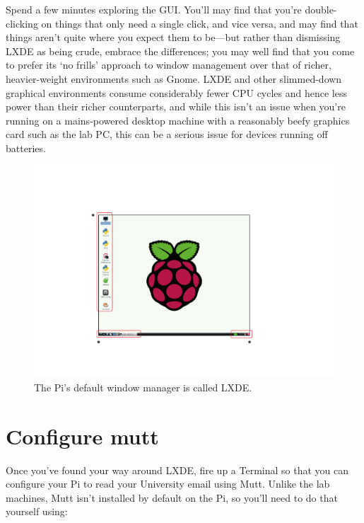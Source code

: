 Spend a few minutes exploring the GUI. You'll may find that you're double-clicking on things that only need a single click, and vice versa, and may find that things aren't quite where you expect them to be---but rather than dismissing LXDE as being crude, embrace the differences; you may well find that you come to prefer its `no frills' approach to window management over that of richer, heavier-weight environments such as Gnome. LXDE and other slimmed-down graphical environments consume considerably fewer CPU cycles and hence less power than their richer counterparts, and while this isn't an issue when you're running on a mains-powered desktop machine with a reasonably beefy graphics card such as the lab PC, this can be a serious issue for devices running off batteries. 

\begin{figure}
\centerline{\includegraphics[width=14cm]{images/lxde-desktop}}
\caption{The Pi's default window manager is called LXDE.}\label{figure:lxde-desktop}
\end{figure}

\section{Configure mutt}

Once you've found your way around LXDE, fire up a Terminal so that you can configure your Pi to read your University email using Mutt. Unlike the lab machines, Mutt isn't installed by default on the Pi, so you'll need to do that yourself using:


